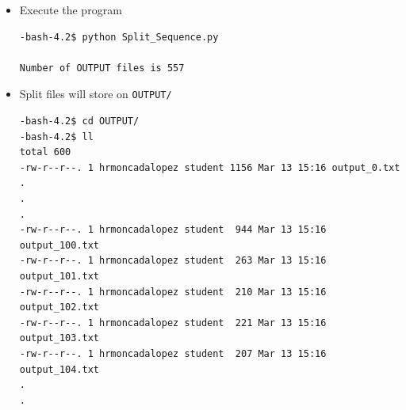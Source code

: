 \documentclass{article}
\begin{document}
\begin{itemize}
\begin{description}
\begin{verbatim}
# Open the input file 
input = open('Contig_Subsets_Translated/ContigSubset5TRANS.txt', 'r').read().split('\n')

at = 0   # initialize output file
for lines in range(0, len(input), splitLen):
# First, get the list slice
    outputData = input[lines:lines+splitLen]

# Now open the output file, join the new slice with newlines and write it out. Then close the file.
    output = open(outputBase + str(at) + '.txt', 'w') #  open a file to write info
    output.write('\n'.join(outputData)) # # writes a string str to the file
    output.close()   # closes the opened file. A closed file cannot be read or written any more.

# Increment the counter
    at += 1

print ("Number of OUTPUT files is %d" %(at))
\end{verbatim}
\normalsize
\end{description}
\item Execute the program
\begin{verbatim}
-bash-4.2$ python Split_Sequence.py 

Number of OUTPUT files is 557
\end{verbatim}
\item Split files will store on \verb+OUTPUT/+
\scriptsize\begin{verbatim}
-bash-4.2$ cd OUTPUT/
-bash-4.2$ ll
total 600
-rw-r--r--. 1 hrmoncadalopez student 1156 Mar 13 15:16 output_0.txt
.
.
.
-rw-r--r--. 1 hrmoncadalopez student  944 Mar 13 15:16 output_100.txt
-rw-r--r--. 1 hrmoncadalopez student  263 Mar 13 15:16 output_101.txt
-rw-r--r--. 1 hrmoncadalopez student  210 Mar 13 15:16 output_102.txt
-rw-r--r--. 1 hrmoncadalopez student  221 Mar 13 15:16 output_103.txt
-rw-r--r--. 1 hrmoncadalopez student  207 Mar 13 15:16 output_104.txt
.
.
\end{verbatim}
\normalsize
\end{itemize}
\end{document}
